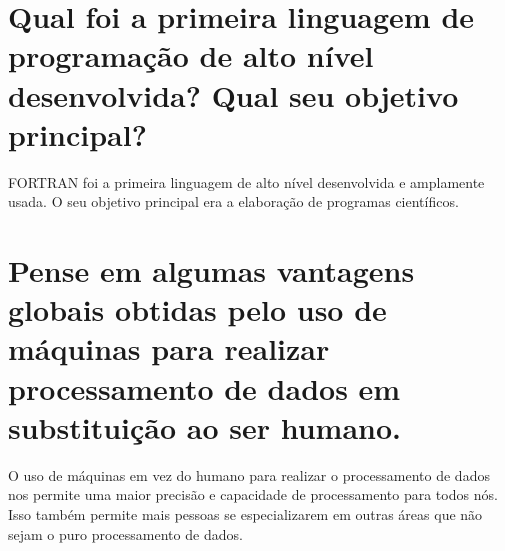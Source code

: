 \documentclass[11pt]{article}
\begin{document}
\section{Qual foi a primeira linguagem de programação de alto nível desenvolvida? Qual seu objetivo principal?}
\label{sec:org31be35f}
FORTRAN foi a primeira linguagem de alto nível desenvolvida e amplamente usada.
O seu objetivo principal era a elaboração de programas científicos.
\section{Pense em algumas vantagens globais obtidas pelo uso de máquinas para realizar processamento de dados em substituição ao ser humano.}
\label{sec:org28c0b51}
O uso de máquinas em vez do humano para realizar o processamento de dados nos
permite uma maior precisão e capacidade de processamento para todos nós. Isso
também permite mais pessoas se especializarem em outras áreas que não sejam o
puro processamento de dados.
\end{document}
